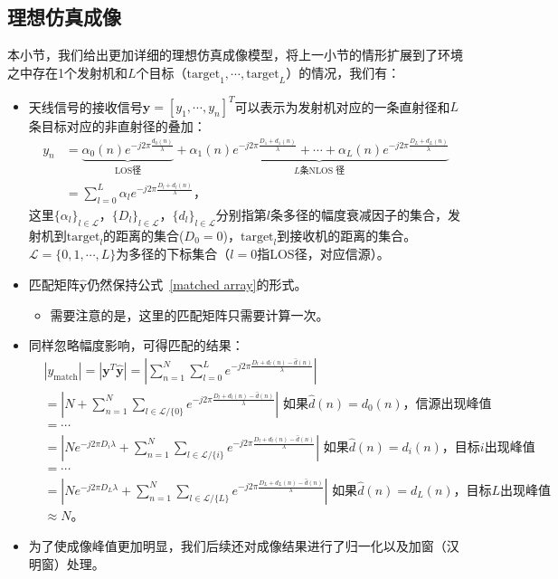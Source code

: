 \subsection{理想仿真成像}
本小节，我们给出更加详细的理想仿真成像模型，将上一小节的情形扩展到了环境之中存在1个发射机和$L$个目标（$\text{target}_1,\cdots,\text{target}_L$）的情况，我们有：
\begin{itemize}
  \item 天线信号的接收信号$\boldsymbol{y}=[y_1,\cdots,y_n]^T$可以表示为发射机对应的一条直射径和$L$条目标对应的非直射径的叠加：
  \begin{align}
    y_n &= \underbrace{\alpha_0(n)e^{-j2\pi\frac{d_0(n)}{\lambda}}}_{\text{LOS径}} + \underbrace{\alpha _1(n)e^{ - j2\pi \frac{D_1 + d_1(n)}{\lambda }} + \cdots + \alpha _L(n)e^{ - j2\pi \frac{D_L + d_L(n)}{\lambda }}}_{L\text{条NLOS 径}} \nonumber \\
    &= \sum_{l=0}^L \alpha_l e^{-j 2\pi \frac{D_l + d_l(n)}{\lambda}} \text{，}
  \end{align}
  这里$\{\alpha_l\}_{l\in \mathcal{L}}$，$\{D_l\}_{l\in \mathcal{L}}$，$\{d_l\}_{l \in \mathcal{L}}$分别指第$l$条多径的幅度衰减因子的集合，发射机到$\text{target}_l$的距离的集合($D_0 = 0$)，$\text{target}_l$到接收机的距离的集合。$\mathcal{L}=\{0,1,\cdots,L\}$为多径的下标集合（$l=0$指LOS径，对应信源）。
  \item 匹配矩阵$\hat{\boldsymbol{y}}$仍然保持公式~\eqref{matched array}的形式。
  \begin{itemize}
    \item 需要注意的是，这里的匹配矩阵只需要计算一次。
  \end{itemize}
  \item 同样忽略幅度影响，可得匹配的结果：
  \begin{align}
    &|y_{\text{match}}| = |\boldsymbol{y}^T\hat{\boldsymbol{y}}| = \left| \sum\limits_{n=1}^N \sum\limits_{l=0}^{L}e^{-j2\pi\frac{D_l+d_l(n)-\hat{d}(n)}{\lambda}} \right| \nonumber \\
    & = \left| N + \sum\limits_{n=1}^N\sum_{l \in \mathcal{L}/\{0\}}e^{-j2\pi\frac{D_l+d_l(n)-\hat{d}(n)}{\lambda}}  \right| \text{ 如果}\hat{d}(n)=d_0(n)\text{，信源出现峰值} \nonumber \\ 
    & = \cdots \nonumber \\
    & = \left| Ne^{-j2\pi D_i\lambda} + \sum\limits_{n=1}^N\sum_{l \in \mathcal{L}/\{i\}}e^{-j2\pi\frac{D_l+d_l(n)-\hat{d}(n)}{\lambda}}  \right| \text{ 如果}\hat{d}(n)=d_i(n)\text{，目标}i\text{出现峰值} \nonumber \\
    & = \cdots \nonumber \\
    & = \left| Ne^{-j2\pi D_L\lambda} + \sum\limits_{n=1}^N\sum_{l \in \mathcal{L}/\{L\}}e^{-j2\pi\frac{D_L+d_L(n)-\hat{d}(n)}{\lambda}}  \right| \text{ 如果}\hat{d}(n)=d_L(n)\text{，目标}L\text{出现峰值} \nonumber \\
    & \approx N \text{。}
  \end{align}
  \item 为了使成像峰值更加明显，我们后续还对成像结果进行了归一化以及加窗（汉明窗）处理。
\end{itemize}
